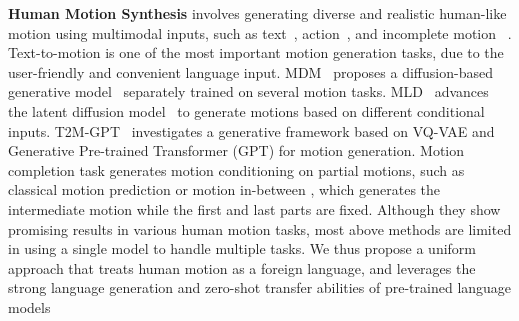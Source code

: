 \textbf{Human Motion Synthesis} involves generating diverse and realistic human-like motion using multimodal inputs, such as text~\cite{Guo_2022_CVPR_humanml3d,petrovich22temos,zhang2022motiondiffuse,mdm2022human,chuan2022tm2t,ahuja2019language2pose,kim2022flame}, action~\cite{petrovich21actor, guo2020action2motion,mdm2022human,chen2023mld}, and incomplete motion ~\cite{yuan2020dlow, zhang2021we, ma2022multi,mdm2022human}.
%
Text-to-motion is one of the most important motion generation tasks, due to the user-friendly and convenient language input. MDM~\cite{mdm2022human} proposes a diffusion-based generative model~\cite{ho2020denoising} separately trained on several motion tasks. MLD~\cite{chen2023mld} advances the latent diffusion model~\cite{song2020denoising,stable_diffusion} to generate motions based on different conditional inputs.
%
T2M-GPT~\cite{zhang2023generating} investigates a generative framework based on VQ-VAE and Generative Pre-trained Transformer (GPT) for motion generation. 
%
Motion completion task generates motion conditioning on partial motions, such as classical motion prediction \cite{yuan2020dlow, zhang2021we, ma2022multi} or motion in-between \cite{mdm2022human}, which generates the intermediate motion while the first and last parts are fixed.
%
Although they show promising results in various human motion tasks, most above methods are limited in using a single model to handle multiple tasks. We thus propose a uniform approach that treats human motion as a foreign language, and leverages the strong language generation and zero-shot transfer abilities of pre-trained language models %


